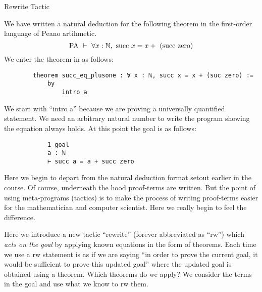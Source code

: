 \documentclass{book}
\begin{document}
\begin{eg}{Rewrite Tactic}

    We have written a natural deduction for the following theorem in the first-order language of Peano artihmetic. $$ \text{PA} \ \vdash \ \forall x : \mathbb{N}, \ \text{succ} \ x = x + \ (\text{succ} \ \text{zero})$$ We enter the theorem in as follows: 
    \begin{center}
        \begin{lstlisting}
        theorem succ_eq_plusone : ∀ x : ℕ, succ x = x + (suc zero) :=
            by
                intro a
        \end{lstlisting}
    \end{center}
    We start with ``intro a'' because we are proving a universally quantified statement. We need an arbitrary natural number to write the program showing the equation always holds. At this point the goal is as follows: 
    \begin{center}
        \begin{lstlisting}
            1 goal            
            a : ℕ            
            ⊢ succ a = a + succ zero
        \end{lstlisting}
    \end{center}
    Here we begin to depart from the natural deduction format setout earlier in the course. Of course, underneath the hood proof-terms are written. But the point of using meta-programs (tactics) is to make the process of writing proof-terms easier for the mathematician and computer scientist. Here we really begin to feel the difference.

    Here we introduce a new tactic ``rewrite'' (forever abbreviated as ``rw'') which \emph{acts on the goal} by applying known equations in the form of theorems. Each time we use a rw statement is as if we are saying ``in order to prove the current goal, it would be sufficient to prove this updated goal'' where the updated goal is obtained using a theorem. Which theorems do we apply? We consider the terms in the goal and use what we know to rw them. 


\end{eg}
\end{document}
